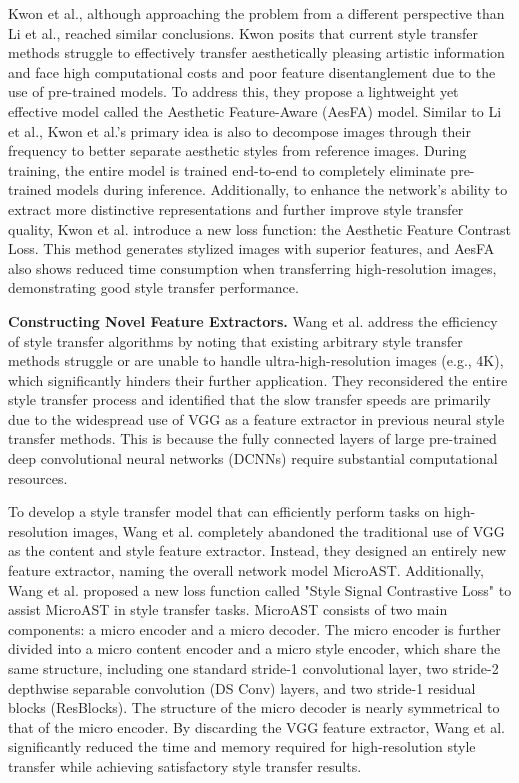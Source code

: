 \documentclass[preprint,12pt]{elsarticle}
\begin{document}
Kwon et al.\citep{71kwon2024aesfa}, although approaching the problem from a different perspective than Li et al.\citep{03li2023frequency}, reached similar conclusions. Kwon posits that current style transfer methods struggle to effectively transfer aesthetically pleasing artistic information and face high computational costs and poor feature disentanglement due to the use of pre-trained models. To address this, they propose a lightweight yet effective model called the Aesthetic Feature-Aware (AesFA) model. Similar to Li et al.\citep{03li2023frequency}, Kwon et al.'s primary idea is also to decompose images through their frequency to better separate aesthetic styles from reference images. During training, the entire model is trained end-to-end to completely eliminate pre-trained models during inference. Additionally, to enhance the network's ability to extract more distinctive representations and further improve style transfer quality, Kwon et al. introduce a new loss function: the Aesthetic Feature Contrast Loss. This method generates stylized images with superior features, and AesFA also shows reduced time consumption when transferring high-resolution images, demonstrating good style transfer performance.

\textbf{Constructing Novel Feature Extractors.} \quad Wang et al.\citep{72wang2023microast} address the efficiency of style transfer algorithms by noting that existing arbitrary style transfer methods struggle or are unable to handle ultra-high-resolution images (e.g., 4K), which significantly hinders their further application. They reconsidered the entire style transfer process and identified that the slow transfer speeds are primarily due to the widespread use of VGG\citep{25simonyan2014very} as a feature extractor in previous neural style transfer methods. This is because the fully connected layers of large pre-trained deep convolutional neural networks (DCNNs) require substantial computational resources.

To develop a style transfer model that can efficiently perform tasks on high-resolution images, Wang et al. completely abandoned the traditional use of VGG\citep{25simonyan2014very} as the content and style feature extractor. Instead, they designed an entirely new feature extractor, naming the overall network model MicroAST. Additionally, Wang et al. proposed a new loss function called "Style Signal Contrastive Loss" to assist MicroAST in style transfer tasks. MicroAST consists of two main components: a micro encoder and a micro decoder. The micro encoder is further divided into a micro content encoder and a micro style encoder, which share the same structure, including one standard stride-1 convolutional layer, two stride-2 depthwise separable convolution (DS Conv) layers, and two stride-1 residual blocks (ResBlocks). The structure of the micro decoder is nearly symmetrical to that of the micro encoder. By discarding the VGG\citep{25simonyan2014very} feature extractor, Wang et al. significantly reduced the time and memory required for high-resolution style transfer while achieving satisfactory style transfer results.
\end{document}
